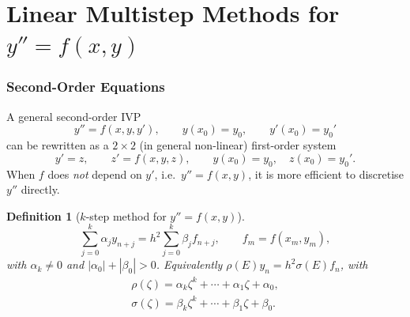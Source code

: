 \documentclass[11pt,a4paper]{article}
\numberwithin{equation}{section}
\theoremstyle{spacedplain}
\theoremstyle{spaceddefinition}
\newtheorem{definition}[theorem]{Definition}
\theoremstyle{spacedremark}
\begin{document}
\part{Linear Multistep Methods for \(y''=f(x,y)\)}

\section{Second-Order Equations}

A general second-order IVP
\[
  y''=f(x,y,y'),\qquad y(x_0)=y_0,\qquad y'(x_0)=y_0'
\]
can be rewritten as a \(2\times2\) (in general non-linear) first-order
system
\[
  y'=z,\qquad z'=f(x,y,z),\qquad y(x_0)=y_0,\quad z(x_0)=y_0'.
\]
When \(f\) does \emph{not} depend on \(y'\), i.e.\ \(y''=f(x,y)\), it is
more efficient to discretise \(y''\) directly.

\begin{definition}[\(k\)-step method for \(y''=f(x,y)\)]
\begin{equation}\label{eq:lmm2}
  \sum_{j=0}^k\alpha_jy_{n+j}=h^2\sum_{j=0}^k\beta_jf_{n+j},
  \qquad f_m=f(x_m,y_m),
\end{equation}
with \(\alpha_k\ne0\) and \(|\alpha_0|+|\beta_0|>0\).  Equivalently
\(\rho(E)y_n=h^2\sigma(E)f_n\), with
\[
\begin{gathered}
  \rho(\zeta)=\alpha_k\zeta^k+\cdots+\alpha_1\zeta+\alpha_0,
  \\
  \sigma(\zeta)=\beta_k\zeta^k+\cdots+\beta_1\zeta+\beta_0.
\end{gathered}
\]
\end{definition}
\end{document}
